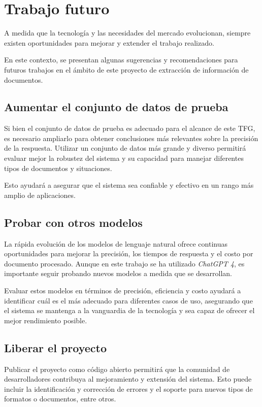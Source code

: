 \section{Trabajo futuro}

A medida que la tecnología y las necesidades del mercado evolucionan, siempre existen oportunidades para mejorar y
extender el trabajo realizado.

En este contexto, se presentan algunas sugerencias y recomendaciones para futuros trabajos en el ámbito de este proyecto
de extracción de información de documentos.

\subsection{Aumentar el conjunto de datos de prueba}

Si bien el conjunto de datos de prueba es adecuado para el alcance de este TFG, es necesario ampliarlo para obtener
conclusiones más relevantes sobre la precisión de la respuesta.
Utilizar un conjunto de datos más grande y diverso permitirá evaluar mejor la robustez del sistema y su capacidad para
manejar diferentes tipos de documentos y situaciones.

Esto ayudará a asegurar que el sistema sea confiable y efectivo en un rango más amplio de aplicaciones.

\subsection{Probar con otros modelos}

La rápida evolución de los modelos de lenguaje natural ofrece continuas oportunidades para mejorar la precisión, los
tiempos de respuesta y el costo por documento procesado.
Aunque en este trabajo se ha utilizado \textit{ChatGPT 4}, es importante seguir probando nuevos modelos a medida que se
desarrollan.

Evaluar estos modelos en términos de precisión, eficiencia y costo ayudará a identificar cuál es el más adecuado para
diferentes casos de uso, asegurando que el sistema se mantenga a la vanguardia de la tecnología y sea capaz de ofrecer
el mejor rendimiento posible.

\subsection{Liberar el proyecto}

Publicar el proyecto como código abierto permitirá que la comunidad de desarrolladores contribuya al mejoramiento y
extensión del sistema.
Esto puede incluir la identificación y corrección de errores y el soporte para nuevos tipos de formatos o documentos,
entre otros.


